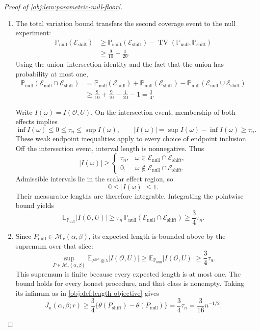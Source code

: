 \begin{proof}[Proof of \cref{obj:lem:parametric-null-floor}]
\begin{enumerate}
\item The total variation bound transfers the second coverage event to the null experiment:
\[
\begin{aligned}
\mathbb P_{\mathrm{null}}(\mathcal E_{\mathrm{shift}})
&\ge
\mathbb P_{\mathrm{shift}}(\mathcal E_{\mathrm{shift}})
-
\operatorname{TV}
(\mathbb P_{\mathrm{null}},\mathbb P_{\mathrm{shift}})\\
&\ge\frac9{10}-\frac1{20}.
\end{aligned}
\]
Using the union--intersection identity and the fact that the union has probability at most one,
\[
\begin{aligned}
\mathbb P_{\mathrm{null}}
(\mathcal E_{\mathrm{null}}\cap\mathcal E_{\mathrm{shift}})
&=
\mathbb P_{\mathrm{null}}(\mathcal E_{\mathrm{null}})
+
\mathbb P_{\mathrm{null}}(\mathcal E_{\mathrm{shift}})
-
\mathbb P_{\mathrm{null}}
(\mathcal E_{\mathrm{null}}\cup\mathcal E_{\mathrm{shift}})\\
&\ge
\frac9{10}+\frac9{10}-\frac1{20}-1
=\frac34.
\end{aligned}
\]

Write \(I(\omega)=I(\mathcal O,U)\). On the intersection event, membership of both effects implies
\[
\inf I(\omega)\le0\le\tau_n\le\sup I(\omega),
\qquad
|I(\omega)|
=
\sup I(\omega)-\inf I(\omega)
\ge\tau_n.
\]
These weak endpoint inequalities apply to every choice of endpoint inclusion. Off the intersection event, interval length is nonnegative. Thus
\[
|I(\omega)|\ge
\begin{cases}
\tau_n,
&\omega\in\mathcal E_{\mathrm{null}}\cap\mathcal E_{\mathrm{shift}},\\
0,
&\omega\notin\mathcal E_{\mathrm{null}}\cap\mathcal E_{\mathrm{shift}}.
\end{cases}
\]
Admissible intervals lie in the scalar effect region, so
\[
0\le |I(\omega)|\le1.
\]
Their measurable lengths are therefore integrable. Integrating the pointwise bound yields
\[
\mathbb E_{\mathbb P_{\mathrm{null}}}|I(\mathcal O,U)|
\ge
\tau_n\,
\mathbb P_{\mathrm{null}}
(\mathcal E_{\mathrm{null}}\cap\mathcal E_{\mathrm{shift}})
\ge\frac34\tau_n.
\]

\item Since \(P_{\mathrm{null}}\in\mathcal M_r(\alpha,\beta)\), its expected length is bounded above by the supremum over that slice:
\[
\sup_{P\in\mathcal M_r(\alpha,\beta)}
\mathbb E_{P^{\otimes n}\otimes\lambda}|I(\mathcal O,U)|
\ge
\mathbb E_{\mathbb P_{\mathrm{null}}}|I(\mathcal O,U)|
\ge\frac34\tau_n.
\]
This supremum is finite because every expected length is at most one. The bound holds for every honest procedure, and that class is nonempty. Taking its infimum as in \cref{obj:def:length-objective} gives
\[
J_n(\alpha,\beta;r)
\ge
\frac34\{\theta(P_{\mathrm{shift}})-\theta(P_{\mathrm{null}})\}
=
\frac34\tau_n
=
\frac3{16}n^{-1/2}.
\]
\end{enumerate}
\end{proof}
